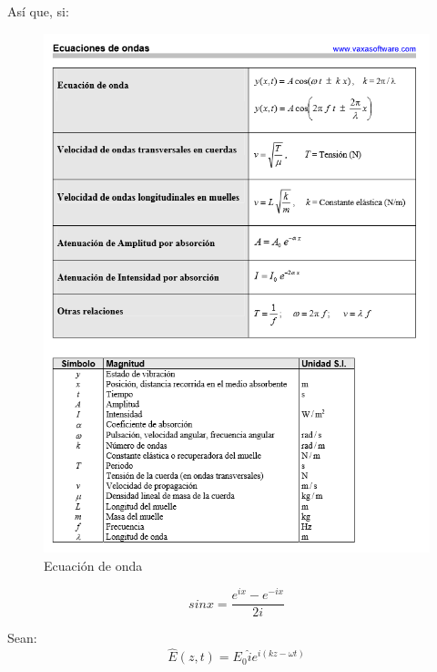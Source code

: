 \documentclass[]{article}
\begin{document}
Así que, si:\\


\begin{figure}[h!]
	\centering
	\includegraphics[scale=0.8]{Imagenes/ecOnda}
	\caption{Ecuación de onda}
	\label{fig:ecOnda}
\end{figure}


\begin{equation}
sin x=\frac{e^{ix}-e^{-ix}}{2i}
\end{equation}

Sean:\\

\begin{equation}
\hat{E}(z,t)=E_0\hat{i}e^{i(kz-\omega t)}
\end{equation}
\end{document}
